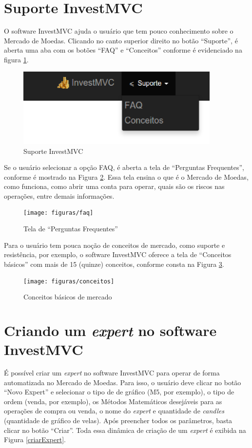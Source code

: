 \section{Suporte InvestMVC}
O software InvestMVC ajuda o usuário que tem pouco conhecimento sobre o Mercado de Moedas. Clicando no canto superior direito no botão “Suporte”, é aberta uma aba com os botões “FAQ” e “Conceitos” conforme é evidenciado na figura \ref{navSuporte}.

\begin{figure}[H]
\centering
\includegraphics[width=0.9\textwidth]{figuras/navSuporte}
\caption{Suporte InvestMVC}
\label{navSuporte}
\end{figure}

Se o usuário selecionar a opção FAQ, é aberta a tela de “Perguntas Frequentes”, conforme é mostrado na Figura \ref{faq}. Essa tela ensina o que é o Mercado de Moedas, como funciona, como abrir uma conta para operar, quais são os riscos nas operações, entre demais informações. 

\begin{figure}[H]
\centering
\texttt{[image: figuras/faq]}
\caption{Tela de “Perguntas Frequentes”}
\label{faq}
\end{figure}

Para o usuário tem pouca noção de conceitos de mercado, como suporte e resistência, por exemplo, o software InvestMVC oferece a tela de “Conceitos básicos” com mais de 15 (quinze) conceitos, conforme consta na Figura \ref{conceitos}. 

\begin{figure}[H]
\centering
\texttt{[image: figuras/conceitos]}
\caption{Conceitos básicos de mercado}
\label{conceitos}
\end{figure}

\section{Criando um \textit{expert} no software InvestMVC}
É possível criar um \textit{expert} no software InvestMVC para operar de forma automatizada no Mercado de Moedas. Para isso, o usuário deve clicar no botão “Novo Expert” e selecionar o tipo de de gráfico (M5, por exemplo), o tipo de ordem (venda, por exemplo), os Métodos Matemáticos desejáveis para as operações de compra ou venda, o nome do \textit{expert} e quantidade de \textit{candles} (quantidade de gráfico de velas). Após preencher todos os parâmetros, basta clicar no botão “Criar”. Toda essa dinâmica de criação de um \textit{expert} é exibida na Figura \ref{criarExpert}.

